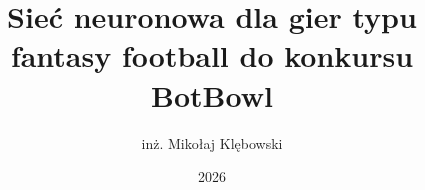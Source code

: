 \documentclass[thesis=mgr,faculty=ee]{EE-dyplom}
\title{Sieć neuronowa dla gier typu fantasy football do konkursu BotBowl}
\author{inż. Mikołaj Klębowski}
\date{2026}
\begin{document}
    \frontpages

    
    \printbibliography


    
    \listoffigures
    \listoftables
\end{document}

